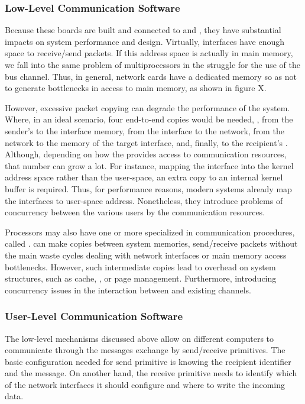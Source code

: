			\subsubsection{Low-Level Communication Software}

				Because these boards are built and connected to \cpus and \ram,
				they have substantial impacts on system performance and \os design.
				Virtually, interfaces have enough \ram space to receive/send packets.
				If this address space is actually in main memory, we fall into the same
				problem of multiprocessors in the struggle for the use of the bus channel.
				Thus, in general, network cards have a dedicated memory so as not to
				generate bottlenecks in access to main memory, as shown in figure X.

				However, excessive packet copying can degrade the performance of the system.
				Where, in an ideal scenario, four end-to-end copies would be needed,
				\ei, from the sender's \ram to the interface memory, from the interface
				to the network, from the network to the memory of the target interface, and,
				finally, to the recipient's \ram.
				Although, depending on how the \os provides access to communication
				resources, that number can grow a lot.
				For instance, mapping the interface into the kernel address space
				rather than the user-space, an extra copy to an internal kernel
				buffer is required.
				Thus, for performance reasons, modern systems already map the interfaces
				to user-space address.
				Nonetheless, they introduce problems of concurrency between the various
				users by the communication resources.

				Processors may also have one or more \cpus specialized in
				communication procedures, called \dma.
				\dmas can make copies between system memories, send/receive packets
				without the main \cpus waste cycles dealing with network interfaces
				or main memory access bottlenecks.
				However, such intermediate copies lead to overhead on system structures,
				such as cache, \tlb, or page management.
				Furthermore, introducing concurrency issues in the interaction between
				\cpus and existing \dma channels.

			\subsubsection{User-Level Communication Software}

				The low-level mechanisms discussed above allow \cpus on different
				computers to communicate through the messages exchange by
				send/receive primitives.
				The basic configuration needed for send primitive is knowing the
				recipient identifier and the message.
				On another hand, the receive primitive needs to identify which of
				the network interfaces it should configure and where to write the
				incoming data.

